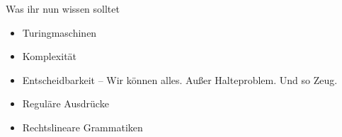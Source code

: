 \begin{frame}	
	\begin{block}{Was ihr nun wissen solltet}
		\begin{itemize}
			\item Turingmaschinen
			\item Komplexität
			\item Entscheidbarkeit -- Wir können alles. Außer Halteproblem. Und so Zeug.
			\item Reguläre Ausdrücke
			\item Rechtslineare Grammatiken
		\end{itemize}
	\end{block}
	
\end{frame}


{}

\slideThanks

